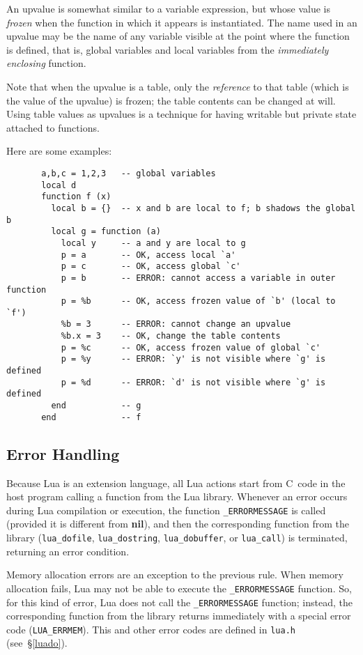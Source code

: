 \documentclass[11pt,twoside,draft]{article}
\makeatletter
\newcommand{\See}[1]{\S\ref{#1}}
\newcommand{\see}[1]{(see~\See{#1})}
\newcommand{\nil}{{\bf nil}}
\newcommand{\DefLIB}[1]{\index{#1@{\tt #1}}}
\makeatother
\begin{document}
An upvalue is somewhat similar to a variable expression,
but whose value is \emph{frozen} when the function in which it
appears is instantiated.
The name used in an upvalue may be the name of any variable visible
at the point where the function is defined,
that is,
global variables and local variables
from the \emph{immediately enclosing} function.

Note that when the upvalue is a table,
only the \emph{reference} to that table
(which is the value of the upvalue) is frozen;
the table contents can be changed at will.
Using table values as upvalues is a technique for having
writable but private state attached to functions.

Here are some examples:
\begin{verbatim}
       a,b,c = 1,2,3   -- global variables
       local d
       function f (x)
         local b = {}  -- x and b are local to f; b shadows the global b
         local g = function (a)
           local y     -- a and y are local to g
           p = a       -- OK, access local `a'
           p = c       -- OK, access global `c'
           p = b       -- ERROR: cannot access a variable in outer function
           p = %b      -- OK, access frozen value of `b' (local to `f')
           %b = 3      -- ERROR: cannot change an upvalue
           %b.x = 3    -- OK, change the table contents
           p = %c      -- OK, access frozen value of global `c'
           p = %y      -- ERROR: `y' is not visible where `g' is defined
           p = %d      -- ERROR: `d' is not visible where `g' is defined
         end           -- g
       end             -- f
\end{verbatim}


\subsection{Error Handling} \label{error}

Because Lua is an extension language,
all Lua actions start from C~code in the host program
calling a function from the Lua library.
Whenever an error occurs during Lua compilation or execution,
the function \verb|_ERRORMESSAGE| is called \DefLIB{_ERRORMESSAGE}
(provided it is different from \nil),
and then the corresponding function from the library
(\verb|lua_dofile|, \verb|lua_dostring|,
\verb|lua_dobuffer|, or \verb|lua_call|)
is terminated, returning an error condition.

Memory allocation errors are an exception to the previous rule.
When memory allocation fails, Lua may not be able to execute the
\verb|_ERRORMESSAGE| function.
So, for this kind of error, Lua does not call
the \verb|_ERRORMESSAGE| function;
instead, the corresponding function from the library
returns immediately with a special error code (\verb|LUA_ERRMEM|).
This and other error codes are defined in \verb|lua.h|
\see{luado}.
\end{document}
